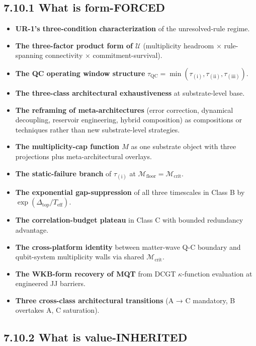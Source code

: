 \documentclass[11pt]{book}
\begin{document}
\subsection{7.10.1 What is form-FORCED}

\begin{itemize}
\item \textbf{UR-1's three-condition characterization} of the unresolved-rule regime.
\item \textbf{The three-factor product form of $\mathcal{U}$} (multiplicity headroom × rule-spanning connectivity × commitment-survival).
\item \textbf{The QC operating window structure} $\tau_\mathrm{QC} = \min(\tau_{(\mathrm{i})}, \tau_{(\mathrm{ii})}, \tau_{(\mathrm{iii})})$.
\item \textbf{The three-class architectural exhaustiveness} at substrate-level base.
\item \textbf{The reframing of meta-architectures} (error correction, dynamical decoupling, reservoir engineering, hybrid composition) as compositions or techniques rather than new substrate-level strategies.
\item \textbf{The multiplicity-cap function $M$} as one substrate object with three projections plus meta-architectural overlays.
\item \textbf{The static-failure branch} of $\tau_{(\mathrm{i})}$ at $\mathcal{M}_\mathrm{floor} = \mathcal{M}_\mathrm{crit}$.
\item \textbf{The exponential gap-suppression} of all three timescales in Class B by $\exp(\Delta_\mathrm{top}/T_\mathrm{eff})$.
\item \textbf{The correlation-budget plateau} in Class C with bounded redundancy advantage.
\item \textbf{The cross-platform identity} between matter-wave Q-C boundary and qubit-system multiplicity walls via shared $\mathcal{M}_\mathrm{crit}$.
\item \textbf{The WKB-form recovery of MQT} from DCGT $\kappa$-function evaluation at engineered JJ barriers.
\item \textbf{Three cross-class architectural transitions} (A → C mandatory, B overtakes A, C saturation).
\end{itemize}

\subsection{7.10.2 What is value-INHERITED}
\end{document}
